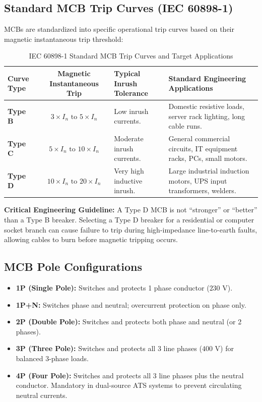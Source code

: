 \subsection{Standard MCB Trip Curves (IEC 60898-1)}
MCBs are standardized into specific operational trip curves based on their magnetic instantaneous trip threshold:

\begin{table}[htbp]
\centering
\small
\caption{IEC 60898-1 Standard MCB Trip Curves and Target Applications}
\label{tab:mcb_trip_curves}
\begin{tabularx}{\textwidth}{l c X X}
\toprule
\textbf{Curve Type} & \textbf{Magnetic Instantaneous Trip} & \textbf{Typical Inrush Tolerance} & \textbf{Standard Engineering Applications} \\
\midrule
\textbf{Type B} & $3 \times I_n \text{ to } 5 \times I_n$ & Low inrush currents. & Domestic resistive loads, server rack lighting, long cable runs. \\
\textbf{Type C} & $5 \times I_n \text{ to } 10 \times I_n$ & Moderate inrush currents. & General commercial circuits, IT equipment racks, PCs, small motors. \\
\textbf{Type D} & $10 \times I_n \text{ to } 20 \times I_n$ & Very high inductive inrush. & Large industrial induction motors, UPS input transformers, welders. \\
\bottomrule
\end{tabularx}
\end{table}

\textbf{Critical Engineering Guideline:} A Type D MCB is not ``stronger'' or ``better'' than a Type B breaker. Selecting a Type D breaker for a residential or computer socket branch can cause failure to trip during high-impedance line-to-earth faults, allowing cables to burn before magnetic tripping occurs.

\subsection{MCB Pole Configurations}
\begin{itemize}
    \item \textbf{1P (Single Pole):} Switches and protects 1 phase conductor ($230\text{ V}$).
    \item \textbf{1P+N:} Switches phase and neutral; overcurrent protection on phase only.
    \item \textbf{2P (Double Pole):} Switches and protects both phase and neutral (or 2 phases).
    \item \textbf{3P (Three Pole):} Switches and protects all 3 line phases ($400\text{ V}$) for balanced 3-phase loads.
    \item \textbf{4P (Four Pole):} Switches and protects all 3 line phases plus the neutral conductor. Mandatory in dual-source ATS systems to prevent circulating neutral currents.
\end{itemize}


